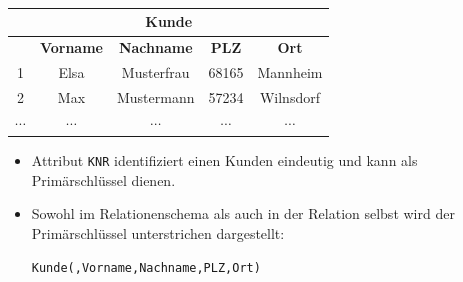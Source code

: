 \begin{frame}\frametitle{\insertsection}
	\framesubtitle{\insertsubsection}
			\begin{center}
				\begin{tabular}{|c|c|c|c|c|}\hline
				\multicolumn{5}{|c|}{\small \textbf{Kunde}}\\\hline\hline
				 \cellcolor{Green}\small \textbf{\key{KNR}} & \small \textbf{Vorname} & \small \textbf{Nachname} & \small \textbf{PLZ} & \small \textbf{Ort} \\\hline
				\cellcolor{Green}\small 1 &\small Elsa &\small Musterfrau &\small 68165 &\small Mannheim \\\hline
				\cellcolor{Green}\small 2 & \small Max &\small  Mustermann & \small 57234 &\small Wilnsdorf \\\hline
				\cellcolor{Green}$\cdots$ & $\cdots$ & $\cdots$ & $\cdots$ & $\cdots$ \\\hline
			\end{tabular}
			\end{center}
 \begin{itemize}
	\item Attribut \texttt{KNR} identifiziert einen Kunden eindeutig und kann als Prim\"arschl\"ussel dienen.
	\item Sowohl im Relationenschema als auch in der Relation selbst wird der Primärschlüssel unterstrichen dargestellt:\\
		\centerline{\texttt{Kunde(,Vorname,Nachname,PLZ,Ort)}}	
 \end{itemize}
\end{frame}

